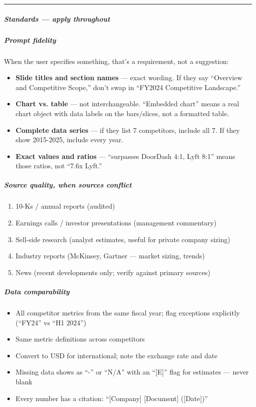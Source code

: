 \documentclass[11pt]{article}
\begin{document}
\vspace{0.5em}\hrule\vspace{0.5em}

\subparagraph{Standards — apply throughout}\mbox{}\par

\subparagraph{Prompt fidelity}\mbox{}\par

When the user specifies something, that's a requirement, not a suggestion:

\begin{itemize}[leftmargin=*,itemsep=2pt,topsep=2pt]
\item {} \textbf{Slide titles and section names} — exact wording. If they say ``Overview and Competitive Scope,'' don't swap in ``FY2024 Competitive Landscape.''
\item {} \textbf{Chart vs. table} — not interchangeable. ``Embedded chart'' means a real chart object with data labels on the bars/slices, not a formatted table.
\item {} \textbf{Complete data series} — if they list 7 competitors, include all 7. If they show 2015-2025, include every year.
\item {} \textbf{Exact values and ratios} — ``surpasses DoorDash 4:1, Lyft 8:1'' means those ratios, not ``7.6x Lyft.''
\end{itemize}

\subparagraph{Source quality, when sources conflict}\mbox{}\par

\begin{enumerate}[leftmargin=*,itemsep=2pt,topsep=2pt]
\item {} 10-Ks / annual reports (audited)
\item {} Earnings calls / investor presentations (management commentary)
\item {} Sell-side research (analyst estimates, useful for private company sizing)
\item {} Industry reports (McKinsey, Gartner — market sizing, trends)
\item {} News (recent developments only; verify against primary sources)
\end{enumerate}

\subparagraph{Data comparability}\mbox{}\par

\begin{itemize}[leftmargin=*,itemsep=2pt,topsep=2pt]
\item {} All competitor metrics from the same fiscal year; flag exceptions explicitly (``FY24'' vs ``H1 2024'')
\item {} Same metric definitions across competitors
\item {} Convert to USD for international; note the exchange rate and date
\item {} Missing data shows as ``-'' or ``N/A'' with an ``[E]'' flag for estimates — never blank
\item {} Every number has a citation: ``[Company] [Document] ([Date])''
\end{itemize}
\end{document}
